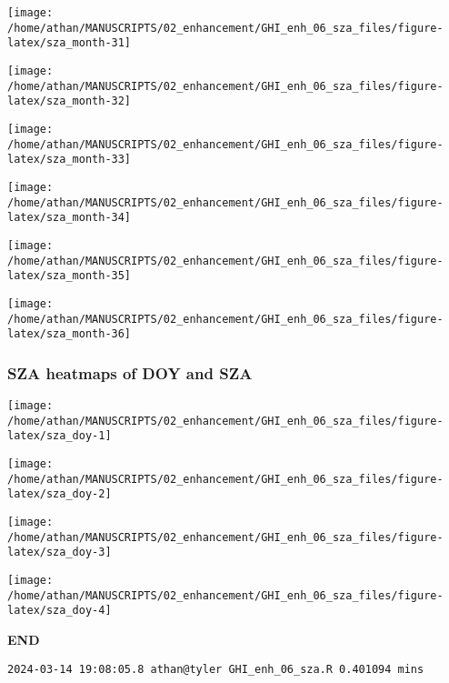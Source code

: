 \documentclass[
  10pt,
  a4paper,oneside]{article}
\begin{document}
\begin{center}\texttt{[image: /home/athan/MANUSCRIPTS/02\_enhancement/GHI\_enh\_06\_sza\_files/figure-latex/sza\_month-31]} \end{center}

\begin{center}\texttt{[image: /home/athan/MANUSCRIPTS/02\_enhancement/GHI\_enh\_06\_sza\_files/figure-latex/sza\_month-32]} \end{center}

\begin{center}\texttt{[image: /home/athan/MANUSCRIPTS/02\_enhancement/GHI\_enh\_06\_sza\_files/figure-latex/sza\_month-33]} \end{center}

\begin{center}\texttt{[image: /home/athan/MANUSCRIPTS/02\_enhancement/GHI\_enh\_06\_sza\_files/figure-latex/sza\_month-34]} \end{center}

\begin{center}\texttt{[image: /home/athan/MANUSCRIPTS/02\_enhancement/GHI\_enh\_06\_sza\_files/figure-latex/sza\_month-35]} \end{center}

\begin{center}\texttt{[image: /home/athan/MANUSCRIPTS/02\_enhancement/GHI\_enh\_06\_sza\_files/figure-latex/sza\_month-36]} \end{center}

\newpage
\FloatBarrier

\hypertarget{sza-heatmaps-of-doy-and-sza}{%
\subsubsection{SZA heatmaps of DOY and SZA}\label{sza-heatmaps-of-doy-and-sza}}

\begin{center}\texttt{[image: /home/athan/MANUSCRIPTS/02\_enhancement/GHI\_enh\_06\_sza\_files/figure-latex/sza\_doy-1]} \end{center}

\begin{center}\texttt{[image: /home/athan/MANUSCRIPTS/02\_enhancement/GHI\_enh\_06\_sza\_files/figure-latex/sza\_doy-2]} \end{center}

\begin{center}\texttt{[image: /home/athan/MANUSCRIPTS/02\_enhancement/GHI\_enh\_06\_sza\_files/figure-latex/sza\_doy-3]} \end{center}

\begin{center}\texttt{[image: /home/athan/MANUSCRIPTS/02\_enhancement/GHI\_enh\_06\_sza\_files/figure-latex/sza\_doy-4]} \end{center}

\textbf{END}

\begin{verbatim}
2024-03-14 19:08:05.8 athan@tyler GHI_enh_06_sza.R 0.401094 mins
\end{verbatim}
\end{document}
